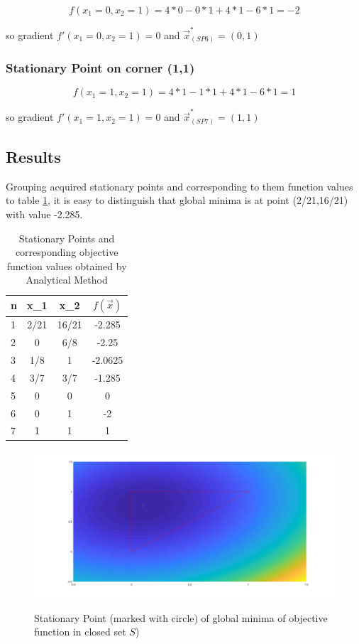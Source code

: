\documentclass[main.tex]{subfiles}
\begin{document}
\begin{equation}
f(x_1=0,x_2=1) = 4*0 - 0*1 + 4*1 - 6*1 = - 2
\end{equation}

so gradient $f'(x_1=0,x_2=1) = 0$ and $\vec{x}_{(SP6)}^{*} = (0,1)$


\subsubsection{Stationary Point on corner (1,1)}

\begin{equation}
f(x_1=1,x_2=1) = 4*1 - 1*1 + 4*1 - 6*1 = 1
\end{equation}

so gradient $f'(x_1=1,x_2=1) = 0$ and $\vec{x}_{(SP7)}^{*} = (1,1)$

\newpage
\subsection{Results}

Grouping acquired stationary points and corresponding to them function values to table \ref{tab:analyticalMethodResults}, it is easy to distinguish that global minima is at point (2/21,16/21) with value -2.285.

\begin{table}[h]
\centering
\begin{tabular}{l | c | c | c }
n & x_1 & x_2 & $f(\vec{x})$\\
\hline \hline
1&	2/21&16/21&-2.285\\
2&	0& 	 6/8&  -2.25\\
3&	1/8& 1&    -2.0625\\
4&	3/7& 3/7&  -1.285\\
5&	0&	 0&     0\\
6&	0&	 1&    -2\\
7&	1&	 1&     1\\
\end{tabular}

\caption{Stationary Points and corresponding objective function values obtained by Analytical Method}
\label{tab:analyticalMethodResults}
\end{table}

\begin{figure}[h]
\centering
\includegraphics[width=\textwidth]{AnalyticalMethod/ObjectiveFunctionAndClosedSet_Minima.jpg}
\label{fig:solution}
\caption{Stationary Point (marked with circle) of global minima of objective function in closed set $S$)}
\end{figure}
\end{document}
